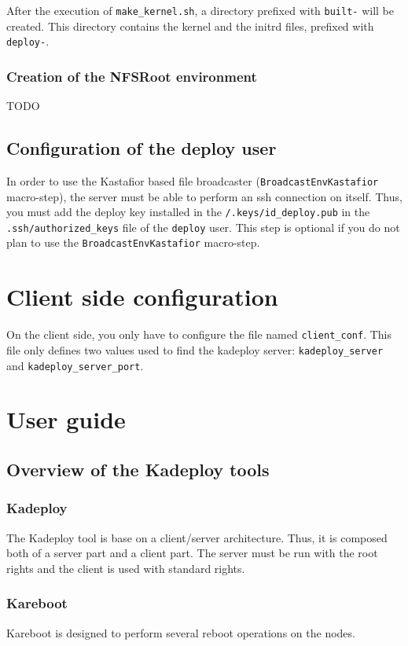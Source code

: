 \documentclass[a4wide,10pt,oneside]{book}
\begin{document}
After the execution of \texttt{make\_kernel.sh}, a directory prefixed with \texttt{built-} will be created. This directory contains the kernel and the initrd files, prefixed with \texttt{deploy-}.

\subsection{Creation of the NFSRoot environment}
TODO

\section{Configuration of the deploy user}
In order to use the Kastafior based file broadcaster (\texttt{BroadcastEnvKastafior} macro-step), the server must be able to perform an ssh connection on itself. Thus, you must add the deploy key installed in the \texttt{/.keys/id\_deploy.pub} in the \texttt{.ssh/authorized\_keys} file of the \texttt{deploy} user. This step is optional if you do not plan to use the \texttt{BroadcastEnvKastafior} macro-step.

\chapter{Client side configuration}
On the client side, you only have to configure the file named \texttt{client\_conf}. This file only defines two values used to find the kadeploy server: \texttt{kadeploy\_server} and \texttt{kadeploy\_server\_port}.

\chapter{User guide}

\section{Overview of the Kadeploy tools}
\subsection{Kadeploy}
The Kadeploy tool is base on a client/server architecture. Thus, it is composed both of a server part and a client part. The server must be run with the root rights and the client is used with standard rights.

\subsection{Kareboot}
Kareboot is designed to perform several reboot operations on the nodes.
\end{document}
